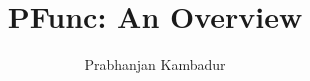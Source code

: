\documentclass[11pt]{article}
\title{PFunc: An Overview}
\author{Prabhanjan Kambadur}
\begin{document}
\maketitle

\tableofcontents

\pagebreak



\pagebreak



\pagebreak



\pagebreak



\pagebreak



\pagebreak



\pagebreak



\pagebreak



\pagebreak



\pagebreak



\pagebreak



\pagebreak



\pagebreak



\pagebreak


\end{document}
